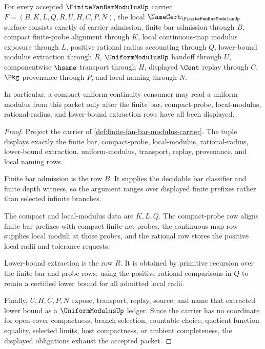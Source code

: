 \begin{theorem}
\label{thm:finite-fan-bar-modulus-namecert-obligations}
For every accepted $\FiniteFanBarModulusUp$ carrier $F=(B,K,L,Q,R,U,H,C,P,N)$, the local $\NameCert_{\FiniteFanBarModulusUp}$ surface consists exactly of carrier admission, finite bar admission through $B$, compact finite-probe alignment through $K$, local continuous-map modulus exposure through $L$, positive rational radius accounting through $Q$, lower-bound modulus extraction through $R$, $\UniformModulusUp$ handoff through $U$, componentwise $\hsame$ transport through $H$, displayed $\Cont$ replay through $C$, $\Pkg$ provenance through $P$, and local naming through $N$.

In particular, a compact-uniform-continuity consumer may read a uniform modulus from this packet only after the finite bar, compact-probe, local-modulus, rational-radius, and lower-bound extraction rows have all been displayed.
\end{theorem}
\begin{proof}
Project the carrier of \autoref{def:finite-fan-bar-modulus-carrier}. The tuple displays exactly the finite bar, compact-probe, local-modulus, rational-radius, lower-bound extraction, uniform-modulus, transport, replay, provenance, and local naming rows.

Finite bar admission is the row $B$. It supplies the decidable bar classifier and finite depth witness, so the argument ranges over displayed finite prefixes rather than selected infinite branches.

The compact and local-modulus data are $K,L,Q$. The compact-probe row aligns finite bar prefixes with compact finite-net probes, the continuous-map row supplies local moduli at those probes, and the rational row stores the positive local radii and tolerance requests.

Lower-bound extraction is the row $R$. It is obtained by primitive recursion over the finite bar and probe rows, using the positive rational comparisons in $Q$ to retain a certified lower bound for all admitted local radii.

Finally, $U,H,C,P,N$ expose, transport, replay, source, and name that extracted lower bound as a $\UniformModulusUp$ ledger. Since the carrier has no coordinate for open-cover compactness, branch selection, countable choice, quotient function equality, selected limits, host compactness, or ambient completeness, the displayed obligations exhaust the accepted packet.
\end{proof}

